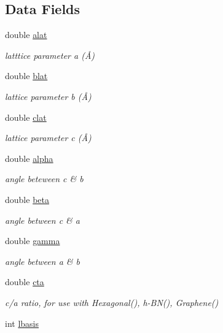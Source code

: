 \subsection*{Data Fields}
\begin{DoxyCompactItemize}
\item 
double \hyperlink{class_gui_a1f0bf13bd26f8dbb3756f4475d50ea3b}{alat}
\begin{DoxyCompactList}\small\item\em latttice parameter a (Å) \end{DoxyCompactList}\item 
double \hyperlink{class_gui_a2bf9af74005d7da17b63c00328831fd3}{blat}
\begin{DoxyCompactList}\small\item\em lattice parameter b (Å) \end{DoxyCompactList}\item 
double \hyperlink{class_gui_ac92e0603324d6b978d1813d0d0c2bef9}{clat}
\begin{DoxyCompactList}\small\item\em lattice parameter c (Å) \end{DoxyCompactList}\item 
double \hyperlink{class_gui_af21a8a5ef3954775896ef3ebc4f12ec5}{alpha}
\begin{DoxyCompactList}\small\item\em angle beteween c \& b \end{DoxyCompactList}\item 
double \hyperlink{class_gui_a2b89466ec45a283f6d7b94b6ffc36640}{beta}
\begin{DoxyCompactList}\small\item\em angle between c \& a \end{DoxyCompactList}\item 
double \hyperlink{class_gui_abe1f84fa6c83a5b3b0d939e6be73d3b5}{gamma}
\begin{DoxyCompactList}\small\item\em angle between a \& b \end{DoxyCompactList}\item 
double \hyperlink{class_gui_a105eb1ab34dee685c11005e47c44ee16}{cta}
\begin{DoxyCompactList}\small\item\em c/a ratio, for use with Hexagonal(), h-\/\+B\+N(), Graphene() \end{DoxyCompactList}\item 
int \hyperlink{class_gui_a8c9eebe2e978c4d0bc1bef77905c7738}{lbasis}

\end{DoxyCompactItemize}
